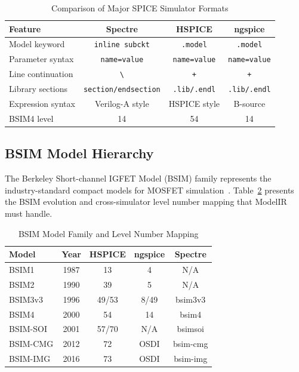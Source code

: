 \documentclass[conference]{IEEEtran}
\begin{document}
\begin{table}[!t]
\caption{Comparison of Major SPICE Simulator Formats}
\label{tab:simulators}
\centering
\renewcommand{\arraystretch}{1.15}
\begin{tabular}{@{}lccc@{}}
\toprule
\textbf{Feature} & \textbf{Spectre} & \textbf{HSPICE} & \textbf{ngspice} \\
\midrule
Model keyword & \texttt{inline subckt} & \texttt{.model} & \texttt{.model} \\
Parameter syntax & \texttt{name=value} & \texttt{name=value} & \texttt{name=value} \\
Line continuation & \texttt{\textbackslash} & \texttt{+} & \texttt{+} \\
Library sections & \texttt{section/endsection} & \texttt{.lib/.endl} & \texttt{.lib/.endl} \\
Expression syntax & Verilog-A style & HSPICE style & B-source \\
BSIM4 level & 14 & 54 & 14 \\
\bottomrule
\end{tabular}
\end{table}

\subsection{BSIM Model Hierarchy}

The Berkeley Short-channel IGFET Model (BSIM) family represents the industry-standard compact models for MOSFET simulation~\cite{bsim4}. Table~\ref{tab:bsim} presents the BSIM evolution and cross-simulator level number mapping that ModelIR must handle.

\begin{table}[!t]
\caption{BSIM Model Family and Level Number Mapping}
\label{tab:bsim}
\centering
\renewcommand{\arraystretch}{1.15}
\begin{tabular}{@{}lcccc@{}}
\toprule
\textbf{Model} & \textbf{Year} & \textbf{HSPICE} & \textbf{ngspice} & \textbf{Spectre} \\
\midrule
BSIM1 & 1987 & 13 & 4 & N/A \\
BSIM2 & 1990 & 39 & 5 & N/A \\
BSIM3v3 & 1996 & 49/53 & 8/49 & bsim3v3 \\
BSIM4 & 2000 & 54 & 14 & bsim4 \\
BSIM-SOI & 2001 & 57/70 & N/A & bsimsoi \\
BSIM-CMG & 2012 & 72 & OSDI & bsim-cmg \\
BSIM-IMG & 2016 & 73 & OSDI & bsim-img \\
\bottomrule
\end{tabular}
\end{table}
\end{document}
